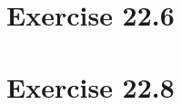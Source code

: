 \documentclass[11pt]{article}
\begin{document}
\section*{Exercise 22.6}
\section*{Exercise 22.8}
%


\end{document}
